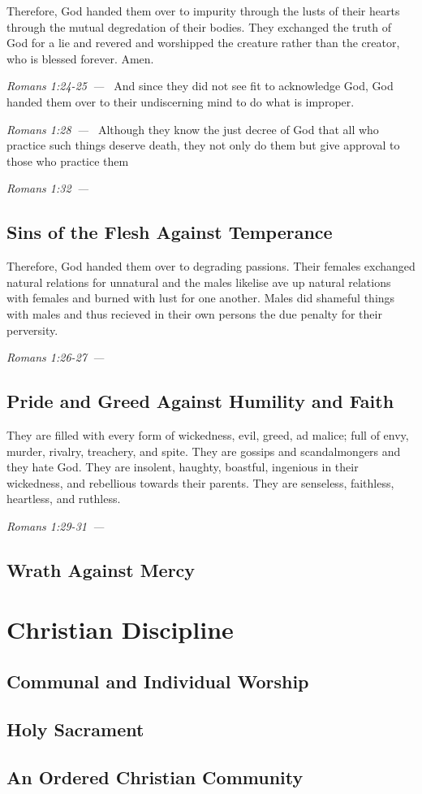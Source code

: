 \documentclass[10pt]{article}
\let\oldquote\quote
\let\endoldquote\endquote
\renewenvironment{quote}[2][]
  {\if\relax\detokenize{#1}\relax
     \def\quoteauthor{#2}%
   \else
     \def\quoteauthor{#2~---~#1}%
   \fi
   \oldquote}
  {\par\nobreak\smallskip\hfill\textit{\quoteauthor}%
   \endoldquote\addvspace{\bigskipamount}}
\begin{document}
\begin{quote}{Romans 1:24-25}
Therefore, God handed them over to impurity through the lusts of their hearts through the mutual degredation of their bodies. They exchanged the truth of God for a lie and revered and worshipped the creature rather than the creator, who is blessed forever. Amen.
\end{quote}
\begin{quote}{Romans 1:28}
And since they did not see fit to acknowledge God, God handed them over to their undiscerning mind to do what is improper.
\end{quote}
\begin{quote}{Romans 1:32}
Although they know the just decree of God that all who practice such things deserve death, they not only do them but give approval to those who practice them
\end{quote}

\subsection*{Sins of the Flesh Against Temperance}
\begin{quote}{Romans 1:26-27}
Therefore, God handed them over to degrading passions. Their females exchanged natural relations for unnatural and the males likelise ave up natural relations with females and burned with lust for one another. Males did shameful things with males and thus recieved in their own persons the due penalty for their perversity. 
\end{quote}

\subsection*{Pride and Greed Against Humility and Faith}
\begin{quote}{Romans 1:29-31}
They are filled with every form of wickedness, evil, greed, ad malice; full of envy, murder, rivalry, treachery, and spite. They are gossips and scandalmongers and they hate God. They are insolent, haughty, boastful, ingenious in their wickedness, and rebellious towards their parents. They are senseless, faithless, heartless, and ruthless. 
\end{quote}

\subsection*{Wrath Against Mercy}



\section*{Christian Discipline}

\subsection*{Communal and Individual Worship}

\subsection*{Holy Sacrament}

\subsection*{An Ordered Christian Community}
\end{document}
